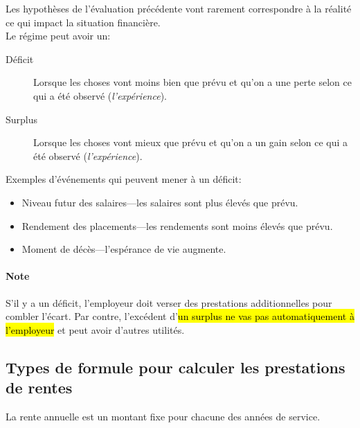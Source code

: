 \documentclass[10pt, french]{article}
\begin{document}
\begin{multicols*}{3}
\begin{definitionNOHFILLsub}
Les hypothèses de l'évaluation précédente vont rarement correspondre à la réalité ce qui impact la situation financière.\\

Le régime peut avoir un:
\begin{description}
	\item[Déficit]	Lorsque les choses vont moins bien que prévu et qu'on a une perte selon ce qui a été observé (\textit{l'expérience}).
	\item[Surplus]	Lorsque les choses vont mieux que prévu et qu'on a un gain selon ce qui a été observé (\textit{l'expérience}).
\end{description}

Exemples d'événements qui peuvent mener à un déficit:
\begin{itemize}[leftmargin = *]
	\item	Niveau futur des salaires---les salaires sont plus élevés que prévu.
	\item	Rendement des placements---les rendements sont moins élevés que prévu.
	\item	Moment de décès---l'espérance de vie augmente.
\end{itemize}


\paragraph{Note} S'il y a un déficit, l'employeur doit verser des prestations additionnelles pour combler l'écart. Par contre, l'excédent d'\hl{un surplus ne vas pas automatiquement à l'employeur} et peut avoir d'autres utilités.
\end{definitionNOHFILLsub}

\subsection*{Types de formule pour calculer les prestations de rentes}

\begin{definitionNOHFILL}
La rente annuelle est un montant fixe pour chacune des années de service.


\end{definitionNOHFILL}
\end{multicols*}
\end{document}
